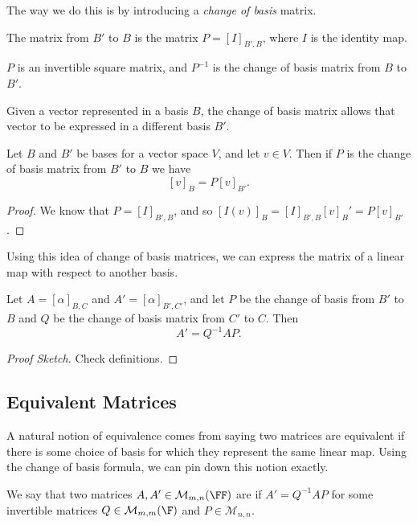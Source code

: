 \documentclass[a4paper]{scrartcl}
\begin{document}
The way we do this is by introducing a \emph{change of basis} matrix.

\begin{definition}    
    The  matrix from $B'$ to $B$ is the matrix
    $P = [I]_{B', B}$, where $I$ is the identity map.
\end{definition}
\begin{remark}
    $P$ is an invertible square matrix, and $P^{-1}$ is the change of basis matrix from $B$ to $B'$. 
\end{remark}

Given a vector represented in a basis $B$, the change of basis matrix allows that vector to be expressed in a different basis $B'$.

\begin{lemma}
    Let $B$ and $B'$ be bases for a vector space $V$, and let $v \in V$. Then if $P$ is the change of basis matrix from $B'$ to $B$ we have
    $$
    [v]_{B} = P[v]_{B'}.
    $$
\end{lemma}
\begin{proof}
    We know that $P = [I]_{B', B}$, and so $[I(v)]_B = [I]_{B', B} [v]_B' = P[v]_{B'}$.
\end{proof}

Using this idea of change of basis matrices, we can express the matrix of a linear map with respect to another basis.

\begin{proposition}
    Let $A = [\alpha]_{B, C}$ and $A' = [\alpha]_{B', C'}$, and let $P$ be the change of basis from $B'$ to $B$ and $Q$ be the change of basis matrix from $C'$ to $C$. Then
    $$
    A' = Q^{-1} AP.
    $$
\end{proposition}
\begin{proof}[Proof Sketch]
    Check definitions.
\end{proof}

\subsection{Equivalent Matrices}

A natural notion of equivalence comes from saying 
two matrices are equivalent if there is some choice of basis for which they represent the same linear map. Using the change of basis formula, we can pin down this notion exactly.

\begin{definition}
    We say that two matrices $A, A' \in \mathcal{M}_{m, n}(\FF)$ are  if $A' = Q^{-1}AP$ for some invertible matrices $Q \in \mathcal{M}_{m, m}(\F)$ and $P \in \mathcal{M}_{n, n}$.    
\end{definition}
\end{document}
